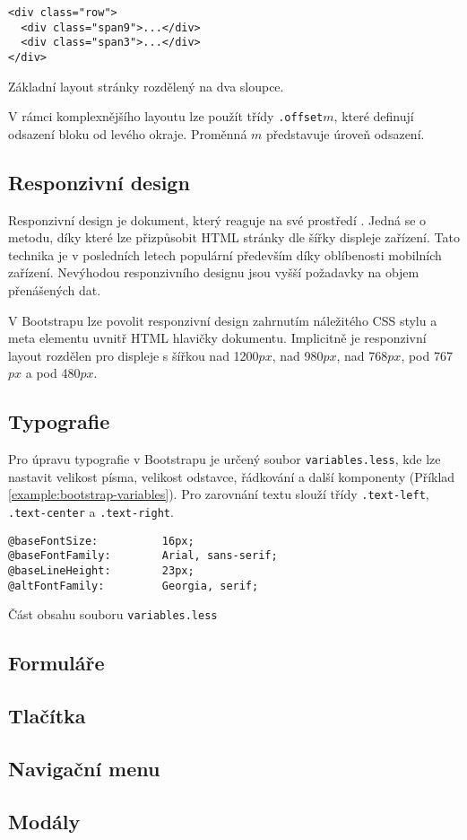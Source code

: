 \begin{example}
    \centering
    \begin{lstlisting}
<div class="row">
  <div class="span9">...</div>
  <div class="span3">...</div>
</div>
    \end{lstlisting}
    \caption{Základní layout stránky rozdělený na dva sloupce.}
    \label{example:basic-layout}
\end{example}

V rámci komplexnějšího layoutu lze použít třídy \texttt{.offset}$m$, které definují odsazení bloku od levého okraje. Proměnná $m$ představuje úroveň odsazení.

\subsection{Responzivní design}

Responzivní design je dokument, který reaguje na své prostředí \cite{responsive-design}. Jedná se o metodu, díky které lze přizpůsobit HTML stránky dle šířky displeje zařízení. Tato technika je v posledních letech populární především díky oblíbenosti mobilních zařízení. Nevýhodou responzivního designu jsou vyšší požadavky na objem přenášených dat.

V Bootstrapu lze povolit responzivní design zahrnutím náležitého CSS stylu a meta elementu uvnitř HTML hlavičky dokumentu. Implicitně je responzivní layout rozdělen pro displeje s šířkou nad 1200$px$, nad 980$px$, nad 768$px$, pod 767$px$ a pod 480$px$.

\subsection{Typografie}

Pro úpravu typografie v Bootstrapu je určený soubor \texttt{variables.less}, kde lze nastavit velikost písma, velikost odstavce, řádkování a další komponenty (Příklad \ref{example:bootstrap-variables}). Pro zarovnání textu slouží třídy \texttt{.text-left}, \texttt{.text-center} a \texttt{.text-right}.

\begin{example}
    \centering
    \begin{lstlisting}
@baseFontSize:          16px;
@baseFontFamily:        Arial, sans-serif;
@baseLineHeight:        23px;
@altFontFamily:         Georgia, serif;
    \end{lstlisting}
    \caption{Část obsahu souboru \texttt{variables.less}}
    \label{example:bootstrap-variables}
\end{example}

\subsection{Formuláře}
\subsection{Tlačítka}
\subsection{Navigační menu}
\subsection{Modály}
